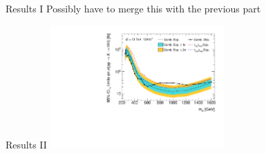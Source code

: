 \documentclass[11pt, xcolor={dvipsnames}, aspectratio=169]{beamer}
\begin{document}

\begin{frame}{Results I}
  Possibly have to merge this with the previous part
\end{frame}


\begin{frame}{Results II}
  \includegraphics[width=0.5\textwidth]{results_res/resonant_upper_limits}
\end{frame}

\end{document}
